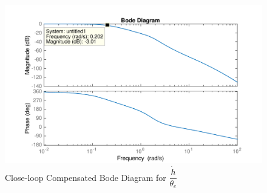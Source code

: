 \documentclass[11pt]{article}
\begin{document}
\begin{figure}[h!]
\begin{center}
\includegraphics[height=.4\textheight]{figures/close_comp_hdot}
\caption{Close-loop Compensated Bode Diagram for $\dfrac{\dot{h}}{\theta_e}$}
\end{center}
\end{figure}
\end{document}
